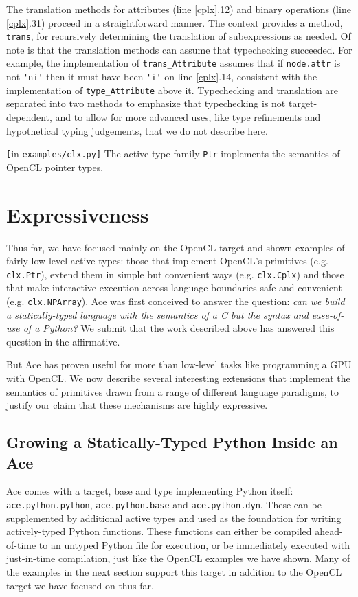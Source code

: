\documentclass[10pt,preprint]{sigplanconf}
\begin{document}
{The translation methods for attributes (line \ref{cplx}.12) and binary operations  (line \ref{cplx}.31) proceed in a straightforward manner. The context provides a method, \verb|trans|, for recursively determining the translation of subexpressions as needed. Of note is that the translation methods can assume that typechecking succeeded. For example, the implementation of \verb|trans_Attribute| assumes that if \verb|node.attr| is not \verb|'ni'| then it must have been \verb|'i'| on line \ref{cplx}.14, consistent with the implementation of \verb|type_Attribute| above it. Typechecking and translation are separated into two methods to emphasize that typechecking is not target-dependent, and to allow for more advanced uses, like type refinements and hypothetical typing judgements, that we do not describe here.

\begin{codelisting}

\caption{\texttt{[}in \texttt{examples/clx.py]} The active type family \texttt{Ptr} implements the semantics of OpenCL pointer types.}
\label{cplx}
\end{codelisting}
\section{Expressiveness}\label{examples}
Thus far, we have focused mainly on the OpenCL target and shown examples of fairly low-level active types: those that implement OpenCL's primitives (e.g. \verb|clx.Ptr|), extend them in simple but convenient ways (e.g. \verb|clx.Cplx|) and those that make interactive execution across language boundaries safe and convenient (e.g. \verb|clx.NPArray|). 
Ace was first conceived to answer the question: \emph{can we build a statically-typed language with the semantics of a C but the syntax and ease-of-use of a Python?} We submit that the work described above has answered this question in the affirmative. 

But Ace has proven useful for more than low-level tasks like programming a GPU with OpenCL. We now describe several interesting extensions that implement the semantics of primitives drawn from a range of different language paradigms, to justify our claim that these mechanisms are highly expressive. 

\subsection{Growing a Statically-Typed Python Inside an Ace}
Ace comes with a target, base and type implementing Python itself: \verb|ace.python.python|, \verb|ace.python.base| and \verb|ace.python.dyn|. These can be supplemented by additional active types and used as the foundation for writing actively-typed Python functions. These functions can either be compiled ahead-of-time to an untyped Python file for execution, or be immediately executed with just-in-time compilation, just like the OpenCL examples we have shown. Many of the examples in the next section support this target in addition to the OpenCL target we have focused on thus far.

}
\end{document}

